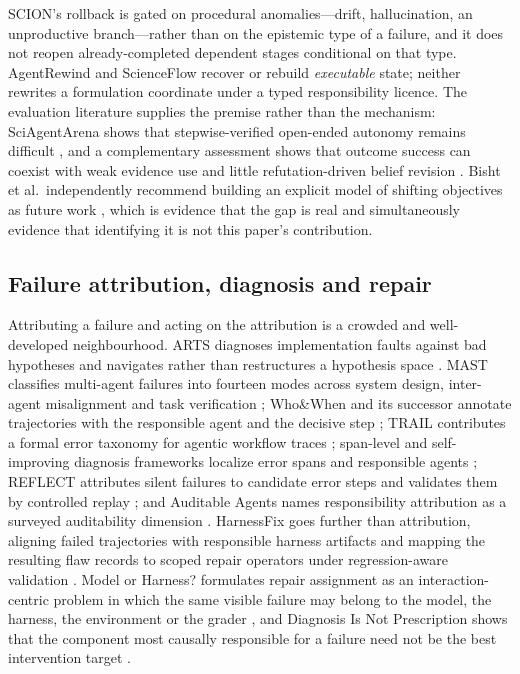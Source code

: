 SCION's rollback is
gated on procedural anomalies---drift, hallucination, an unproductive
branch---rather than on the epistemic type of a failure, and it does not reopen
already-completed dependent stages conditional on that type. AgentRewind and
ScienceFlow recover or rebuild \emph{executable} state; neither rewrites a
formulation coordinate under a typed responsibility licence. The evaluation
literature supplies the premise rather than the mechanism: SciAgentArena shows
that stepwise-verified open-ended autonomy remains difficult
\cite{sciagentarena2026}, and a complementary assessment shows that outcome
success can coexist with weak evidence use and little refutation-driven belief
revision \cite{scientificreasoning2026}. Bisht et al.\ independently recommend
building an explicit model of shifting objectives as future work
\cite{bisht2026}, which is evidence that the gap is real and simultaneously
evidence that identifying it is not this paper's contribution.

\subsection{Failure attribution, diagnosis and repair}

Attributing a failure and acting on the attribution is a crowded and
well-developed neighbourhood. ARTS diagnoses implementation faults against bad
hypotheses and navigates rather than restructures a hypothesis space
\cite{arts2026}. MAST classifies multi-agent failures into fourteen modes across
system design, inter-agent misalignment and task verification \cite{mast2025};
Who\&When and its successor annotate trajectories with the responsible agent and
the decisive step \cite{whowhen2025,whowhenpro2026}; TRAIL contributes a formal
error taxonomy for agentic workflow traces \cite{trail2025}; span-level and
self-improving diagnosis frameworks localize error spans and responsible agents
\cite{spanlevel2026,selfimproving2026}; REFLECT attributes silent failures to
candidate error steps and validates them by controlled replay
\cite{reflect2026}; and Auditable Agents names responsibility attribution as a
surveyed auditability dimension \cite{auditable2026}. HarnessFix goes further
than attribution, aligning failed trajectories with responsible harness
artifacts and mapping the resulting flaw records to scoped repair operators
under regression-aware validation \cite{harnessfix2026}. Model or Harness?
formulates repair assignment as an interaction-centric problem in which the same
visible failure may belong to the model, the harness, the environment or the
grader \cite{modelorharness2026}, and Diagnosis Is Not Prescription shows that
the component most causally responsible for a failure need not be the best
intervention target \cite{diagnosisnotprescription2026}.

